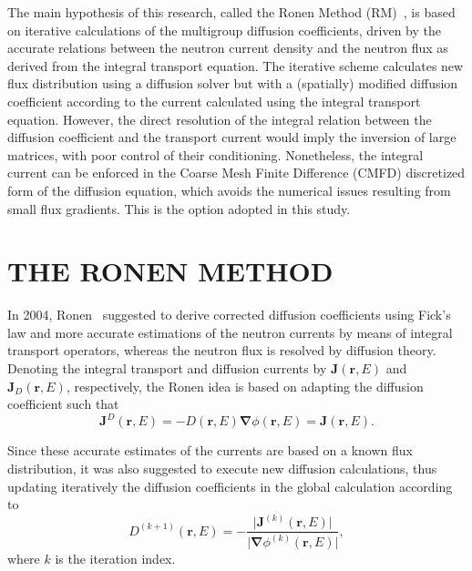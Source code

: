 \documentclass[letterpaper]{physor2020}
\newcommand{\rr}{\ensuremath{\bm{r}}}
\newcommand{\bnabla}{\ensuremath{\bm{\nabla}}}
\newcommand{\rE}{\ensuremath{(\rr,E)}}
\begin{document}
The main hypothesis of this research, called the Ronen Method (RM)~\cite{Ronen-2004,Tomatis-2011}, is based on iterative calculations of the multigroup diffusion coefficients, driven by the accurate relations between the neutron current density and the neutron flux as derived from the integral transport equation. The iterative scheme calculates new flux distribution using a diffusion solver but with a (spatially) modified diffusion coefficient according to the current calculated using the integral transport equation. However, the direct resolution of the integral relation between the diffusion coefficient and the transport current would imply the inversion of large matrices, with poor control of their conditioning. Nonetheless, the integral current can be enforced in the Coarse Mesh Finite Difference (CMFD) discretized form of the diffusion equation, which avoids the numerical issues resulting from small flux gradients. This is the option adopted in this study.

%
%
\section{THE RONEN METHOD}
\label{sec:RM}

In 2004, Ronen~\cite{Ronen-2004} suggested to derive corrected diffusion coefficients using Fick's law and more accurate estimations of the neutron currents by means of integral transport operators, whereas the neutron flux is resolved by diffusion theory. Denoting the integral transport and diffusion currents by $\bm{J}\rE$ and $\bm{J}_D\rE$, respectively, the Ronen idea is based on adapting the diffusion coefficient such that
\begin{equation}\label{eq:Fick}
\bm{J}^D\rE = -D\rE\bnabla\phi\rE = \bm{J}\rE.
\end{equation}

Since these accurate estimates of the currents are based on a known flux distribution, it was also suggested to execute new diffusion calculations, thus updating iteratively the diffusion coefficients in the global calculation according to
\begin{equation}\label{eq:RM-it}
D^{(k+1)}\rE = - \frac{\lvert \bm{J}^{(k)}\rE\rvert}{\lvert\bnabla\phi^{(k)}\rE\rvert},
\end{equation}
where $k$ is the iteration index. %
\end{document}
